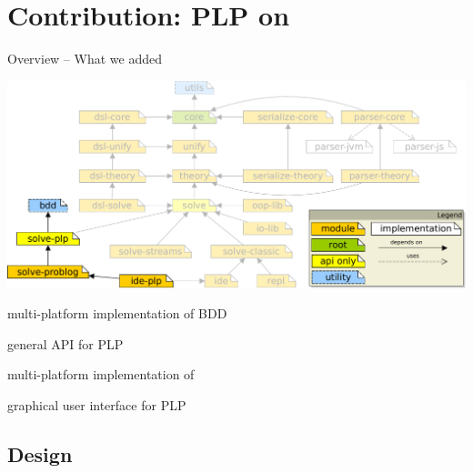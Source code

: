 \documentclass[presentation]{beamer}\mode<presentation>{\usetheme{AMSBolognaFC}}
\begin{document}
\section{Contribution: PLP on \twopkt{}}

\begin{frame}[c]{Overview -- What we added}


    \begin{center}
        \includegraphics[width=.7\linewidth]{img/project-map-diff.pdf}
    \end{center}
    \begin{description}\small
        \item[\module{bdd}] multi-platform implementation of BDD
        \item[\module{solve-plp}] general API for PLP
        \item[\module{solve-problog}] multi-platform implementation of \problog{}
        \item[\module{ide-plp}] graphical user interface for PLP
    \end{description}

\end{frame}

\subsection{Design}
\end{document}
